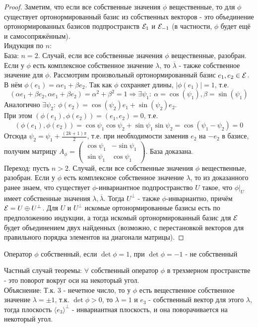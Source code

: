 \begin{proof}
    Заметим, что если все собственные значения $\phi$ вещественные, то для $\phi$ существует ортонормированный базис из собственных векторов - это объединение ортонормированных базисов подпространств $\mathcal{E}_{1}$ и $\mathcal{E}_{-1}$ (в частности, $\phi$ будет ещё и самосопряжённым).\\
    Индукция по $n$:\\
    База: $n = 2$. Случай, если все собственные значения $\phi$ вещественные, разобран. Если у $\phi$ есть комплексное собственное значение $\lambda$, то $\overline{\lambda}$ - также собственное значение для $\phi$. Рассмотрим произвольный ортонормированный базис $e_1, e_2 \in \mathcal{E}$. В нём $\phi(e_1) = \alpha e_1 + \beta e_2$. Так как $\phi$ сохраняет длины, $|\phi(e_1)| = 1$, т.е.
    \[(\alpha e_1 + \beta e_2, \alpha e_1 + \beta e_2) = \alpha^2 + \beta^2 = 1 \Longrightarrow \exists \psi_1: \ \alpha = \cos(\psi_1), \beta = \sin(\psi_1)\]
    Аналогично $\exists \psi_2: \ \phi(e_2) = \cos(\psi_2)e_1 + \sin(\psi_2)e_2$. \\
    При этом $(\phi(e_1), \phi(e_2)) = (e_1, e_2) = 0$, т.е.
    \[(\phi(e_1), \phi(e_2)) = \cos\psi_1\cos\psi_2 + \sin\psi_1\sin\psi_2 = \cos(\psi_1 - \psi_2) = 0\] 
    Отсюда $\psi_2 = \psi_1 + \frac{(2k+1)\pi}{2}$, т.е. при необходимости заменив $e_2$ на $-e_2$ в базисе, получим матрицу $A_\phi = \begin{pmatrix} \cos\psi_1 & -\sin\psi_1 \\ \sin\psi_1 & \cos\psi_1 \end{pmatrix}$. База доказана.\\
    Переход: пусть $n > 2$. Случай, если все собственные значения $\phi$ вещественные, разобран. Если у $\phi$ есть комплексное собственное значение $\lambda$, то из доказанного ранее знаем, что существует $\phi$-инвариантное подпространство $U$ такое, что $\phi|_{U}$ имеет собственные значения $\lambda, \overline{\lambda}$. Тогда $U^\perp$ - также $\phi$-инвариантно, причём $\mathcal{E} = U \oplus U^\perp$. Для $U$ и $U^\perp$ искомые ортонормированные базисы есть по предположению индукции, а тогда искомый ортонормированный базис для $\mathcal{E}$ будет объединением двух найденных (возможно, с перестановкой векторов для правильного порядка элементов на диагонали матрицы).      
\end{proof} 
\begin{definition}
    Оператор $\phi$ собственный, если $\det \phi = 1$, при $\det \phi = -1$ -  не собственный  
\end{definition}
Частный случай теоремы: $\forall$ собственный оператор $\phi$ в трехмерном пространстве - это поворот вокруг оси на некоторый угол.\\
Объяснение: Т.к. 3 - нечетное число, то у $\phi$ есть вещественное собственное значение $\lambda=\pm 1$, т.к. $\det \phi > 0$, то $\lambda=1$ и $e_3$ - собственный вектор для этого $\lambda$, тогда плоскость $\langle e_3 \rangle^{\bot}$ - инвариантная плоскость, и она поворачивается на некоторый угол.
 
 